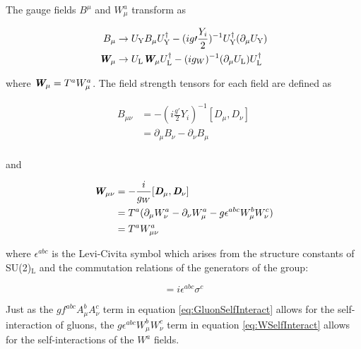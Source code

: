 \documentclass[12pt,a4paper,epsf,portrait,times,epsfig]{report}
\begin{document}
	The gauge fields $B^{\mu}$ and $W_{\mu}^{a}$ transform as

	\begin{align}
		B_{\mu} &\rightarrow U_{\mathrm{Y}}B_{\mu}U_{\mathrm{Y}}^{\dagger}-(ig\prime\frac{Y_{i}}{2})^{-1}U_{\mathrm{Y}}^{\dagger}(\partial_{\mu}U_{\mathrm{Y}}) \\
		\textit{\textbf{W}}_{\mu} &\rightarrow U_{\mathrm{L}}\textit{\textbf{W}}_{\mu}U_{\mathrm{L}}^{\dagger}-(ig_{W})^{-1}(\partial_{\mu}U_{\mathrm{L}})U_{\mathrm{L}}^{\dagger}
	\end{align}

	where $\textit{\textbf{W}}_{\mu} = T^{a}W_{\mu}^{a}$. The field strength tensors for each field are defined as

	\begin{equation}
		\begin{split}
		B_{\mu\nu} &= -(i\frac{g\prime}{2}Y_{i})^{-1}[D_{\mu},D_{\nu}] \\
		&= \partial_{\mu}B_{\nu} - \partial_{\nu}B_{\mu} \\
		\end{split}
	\end{equation}

	and

	\begin{equation} \label{eq:WSelfInteract}
		\begin{split}
			\textit{\textbf{W}}_{\mu\nu} &= -\frac{i}{g_{W}}[\textit{\textbf{D}}_{\mu},\textit{\textbf{D}}_{\nu}] \\
			&= T^{a}(\partial_{\mu}W_{\nu}^{a}-\partial_{\nu}W_{\mu}^{a}-g\epsilon^{abc}W_{\mu}^{b}W_{\nu}^{c}) \\
			&= T^{a}W_{\mu\nu}^{a} \\
		\end{split}
	\end{equation}

	where $\epsilon^{abc}$ is the Levi-Civita symbol which arises from the structure constants of SU(2)$_{\mathrm{L}}$ and the commutation relations of the generators of the group:

	\begin{equation}
		[\sigma^{a},\sigma^{b}]=i\epsilon^{abc}\sigma^{c}
	\end{equation}

	Just as the $gf^{abc}A_{\mu}^{b}A_{\nu}^{c}$ term in equation \ref{eq:GluonSelfInteract} allows for the self-interaction of gluons, the $g\epsilon^{abc}W_{\mu}^{b}W_{\nu}^{c}$ term in equation \ref{eq:WSelfInteract} allows for the self-interactions of the $W^{a}$ fields. \par
\end{document}
